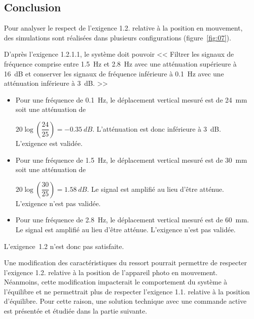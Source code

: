 \subsection{Conclusion}
\ifprof
\else
Pour analyser le respect de l'exigence 1.2. relative à la position en mouvement, des simulations sont réalisées dans plusieurs configurations (figure~\ref{fig:07}).
\fi

\ifprof
\begin{corrige}
D'après l’exigence 1.2.1.1, le système doit pouvoir << Filtrer les signaux de fréquence comprise entre \SI{1,5}{Hz} et \SI{2,8}{Hz} avec une atténuation supérieure à \SI{16}{dB} et conserver les signaux
de fréquence inférieure à \SI{0,1}{Hz} avec une atténuation inférieure à \SI{3}{dB}. >>

\begin{itemize}
\item Pour une fréquence de \SI{0,1}{Hz}, le déplacement vertical mesuré est de \SI{24}{mm} soit une atténuation de 

$20\log \left( \dfrac{24}{25}\right) = -\SI{0,35}{dB}$. L'atténuation est donc inférieure à \SI{3}{dB}. L'exigence est validée.

\item Pour une fréquence de \SI{1,5}{Hz}, le déplacement vertical mesuré est de \SI{30}{mm} soit une atténuation de 

$20\log \left( \dfrac{30}{25}\right) = \SI{1,58}{dB}$. Le signal est amplifié au lieu d'être atténue. L'exigence n'est pas validée.

\item Pour une fréquence de \SI{2,8}{Hz}, le déplacement vertical mesuré est de \SI{60}{mm}. Le signal est amplifié au lieu d'être atténue. L'exigence n'est pas validée.

\end{itemize}

L'exigence~1.2 n'est donc pas satisfaite. 

\end{corrige}
\else
\fi

\ifprof
\else
Une modification des caractéristiques du ressort pourrait permettre de respecter l'exigence 1.2. relative à la position de l'appareil photo en mouvement. Néanmoins, cette modification impacterait le comportement du système à l'équilibre et ne permettrait plus de respecter l'exigence 1.1. relative à la position d'équilibre. Pour cette raison, une solution technique avec une commande active est présentée et étudiée dans la partie suivante.


